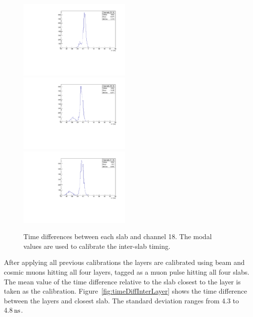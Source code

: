\documentclass[12pt]{article}
\newcommand{\unit}[1]{\ensuremath{\text{\,#1}}\xspace}
\begin{document}
\begin{figure}
\centering
    \includegraphics[width=0.49\textwidth]{figures/timingPlots/intraSlice/Channels_20_18.pdf}~
    \includegraphics[width=0.49\textwidth]{figures/timingPlots/intraSlice/Channels_28_18.pdf}\\
    \includegraphics[width=0.49\textwidth]{figures/timingPlots/intraSlice/Channels_21_18.pdf}
    \caption{\label{fig:timeDiffInterSlab} Time differences between each slab and channel 18. 
    The modal values are used to calibrate the inter-slab timing.}
\end{figure}

After applying all previous calibrations the layers are calibrated using beam and cosmic muons hitting all 
four layers, tagged as a muon pulse hitting all four slabs. The mean value of the time difference
relative to the slab closest to the layer is taken as the calibration. Figure~\ref{fig:timeDiffInterLayer}
shows the time difference between the layers and closest slab. The standard deviation ranges from
4.3 to 4.8\unit{ns}.
\end{document}

